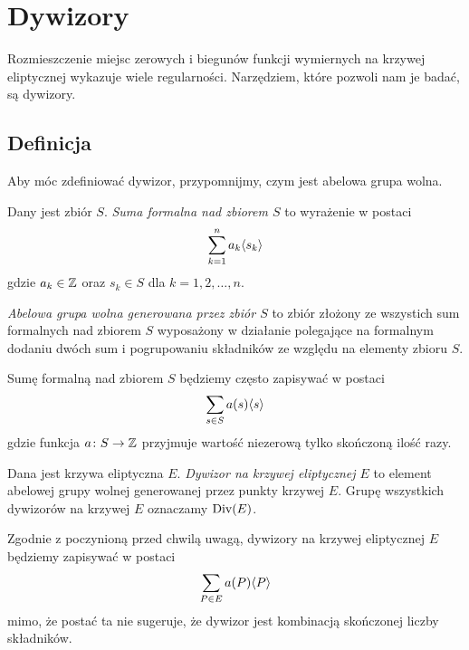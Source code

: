 \section{Dywizory}

Rozmieszczenie miejsc zerowych i biegunów
funkcji wymiernych na krzywej eliptycznej
wykazuje wiele regularności.
Narzędziem, które pozwoli nam je badać, są dywizory.

\subsection*{Definicja}

Aby móc zdefiniować dywizor,
przypomnijmy, czym jest abelowa grupa wolna.

\begin{definition}
Dany jest zbiór $S$.
\emph{Suma formalna nad zbiorem $S$} to wyrażenie w postaci
\begin{equation*}
\sum_{k=1}^n a_k\langle s_k\rangle
\end{equation*}
gdzie $a_k \in \mathbb{Z}$ oraz $s_k \in S$ dla $k = 1, 2, \ldots, n$.

\emph{Abelowa grupa wolna generowana przez zbiór $S$}
to zbiór złożony ze wszystich sum formalnych nad zbiorem $S$
wyposażony w działanie polegające na formalnym dodaniu dwóch sum
i pogrupowaniu składników ze względu na elementy zbioru $S$.
\end{definition}

\begin{remark}
Sumę formalną nad zbiorem $S$ będziemy często zapisywać w postaci
\begin{equation*}
\sum_{s \in S}a(s)\langle s\rangle
\end{equation*}
gdzie funkcja $a \colon S \to \mathbb{Z}$ przyjmuje wartość niezerową
tylko skończoną ilość razy.
\end{remark}

\begin{definition}
Dana jest krzywa eliptyczna $E$.
\emph{Dywizor na krzywej eliptycznej $E$}
to element abelowej grupy wolnej generowanej przez punkty krzywej $E$.
Grupę wszystkich dywizorów na krzywej $E$ oznaczamy $\operatorname{Div}(E)$.
\end{definition}

\begin{remark}
Zgodnie z poczynioną przed chwilą uwagą,
dywizory na krzywej eliptycznej $E$ będziemy zapisywać w postaci
\begin{equation*}
\sum_{P \in E} a(P)\langle P\rangle
\end{equation*}
mimo, że postać ta nie sugeruje,
że dywizor jest kombinacją skończonej liczby składników.
\end{remark}

